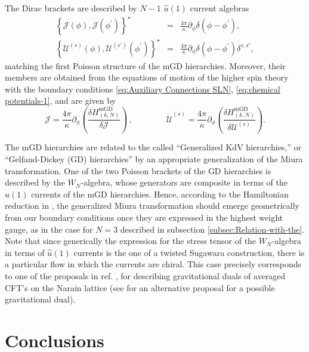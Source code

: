 \documentclass[letterpaper,11pt,oneside]{book}
\begin{document}
The Dirac brackets are described by $N-1$ $\hat{u}\left(1\right)$
current algebras
\begin{eqnarray}
	\left\{ \mathcal{J}\left(\phi\right),\mathcal{J}\left(\phi^{\prime}\right)\right\} ^{\star} & = & \frac{4\pi}{\kappa}\partial_{\phi}\delta\left(\phi-\phi^{\prime}\right),\nonumber \\
	\left\{ \mathcal{U}^{\left(s\right)}\left(\phi\right),\mathcal{U}^{\left(s'\right)}\left(\phi^{\prime}\right)\right\} ^{\star} & = & \frac{4\pi}{\kappa}\partial_{\phi}\delta\left(\phi-\phi^{\prime}\right)\delta^{s,s'},\label{eq:Dirac-1}
\end{eqnarray}
matching the first Poisson structure of the mGD hierarchies. Moreover,
their members are obtained from the equations of motion of the higher
spin theory with the boundary conditions \eqref{eq:Auxiliary Connections SLN},
\eqref{eq:chemical potentials-1}, and are given by
\[
\dot{\mathcal{J}}=\frac{4\pi}{\kappa}\partial_{\phi}\left(\frac{\delta H_{\left(k,N\right)}^{\text{mGD}}}{\delta\mathcal{J}}\right)\,,\qquad\qquad\dot{\mathcal{U}}^{\left(s\right)}=\frac{4\pi}{\kappa}\partial_{\phi}\left(\frac{\delta H_{\left(k,N\right)}^{\text{mGD}}}{\delta\mathcal{U}^{\left(s\right)}}\right).
\]

The mGD hierarchies are related to the called ``Generalized KdV hierarchies,''
or ``Gelfand-Dickey (GD) hierarchies'' by an appropriate generalization
of the Miura transformation. One of the two Poisson brackets of the
GD hierarchies is described by the $W_{N}$-algebra, whose generators
are composite in terms of the $\hat{u}\left(1\right)$ currents of
the mGD hierarchies. Hence, according to the Hamiltonian reduction
in \cite{Drinfeld:1984qv}, the generalized Miura transformation should
emerge geometrically from our boundary conditions once they are expressed
in the highest weight gauge, as in the case for $N=3$ described in
subsection \ref{subsec:Relation-with-the}. Note that since generically
the expression for the stress tensor of the $W_{N}$-algebra in terms
of $\hat{u}\left(1\right)$ currents is the one of a twisted Sugawara
construction, there is a particular flow in which the currents are
chiral. This case precisely corresponds to one of the proposals in
ref. \cite{Perez:2020klz}, for describing gravitational duals of
averaged CFT's on the Narain lattice \cite{Maloney:2020nni,Afkhami-Jeddi:2020ezh}
(see \cite{Cotler:2020ugk} for an alternative proposal for a possible
gravitational dual).


\chapter*{Conclusions \label{sec:5 Conclusions}}
\end{document}
